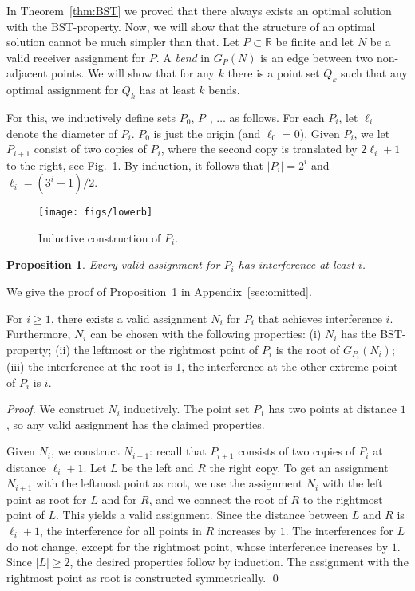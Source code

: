 \documentclass[envcountsect,envcountsame,runningheads,a4paper]{llncs}
\newtheorem{prop}[theorem]{Proposition}
\newcommand\R{{\mathbb R}}
\begin{document}
In Theorem~\ref{thm:BST} we proved that there always exists an
optimal solution with the BST-property. Now, we will
show that the structure of an optimal solution cannot
be much simpler than that. Let $P \subset \R$ be finite
and let $N$ be a valid receiver assignment for $P$. A \emph{bend} in $G_P(N)$
is an edge between two non-adjacent points. We will show that
for any $k$ there is a point set $Q_k$ such that any optimal
assignment for $Q_k$ has at least $k$ bends.

For this, we inductively define sets $P_0$, $P_1$, $\ldots$ as follows.
For each $P_i$, let $\ell_i$ denote the diameter of $P_i$.
$P_0$ is just the origin (and $\ell_0 = 0$). Given $P_i$, we let $P_{i+1}$
consist of two copies of $P_i$, where the second copy is translated
by $2\ell_i + 1$ to the right, see Fig.~\ref{fig:lowerb}. By induction,
it follows that
$|P_i| = 2^i$ and $\ell_i = (3^i-1)/2$.

\begin{figure}
\centering
\texttt{[image: figs/lowerb]}
\caption{Inductive construction of $P_i$.}
\label{fig:lowerb}
\end{figure}

\begin{prop}\label{prop:lowerb}
Every valid assignment for $P_i$ has interference at least
$i$.
\end{prop}

We give the proof of Proposition~\ref{prop:lowerb} in Appendix~\ref{sec:omitted}.

\begin{lemma}\label{lem:opt_ass}
For $i \geq 1$, there exists a valid assignment $N_i$ for
$P_i$ that achieves interference $i$. Furthermore, $N_i$ can
be chosen with the following properties: (i) $N_i$ has the \textup{BST}-property;
(ii) the leftmost or the rightmost point of $P_i$ is the root
of $G_{P_i}(N_i)$; (iii) the interference at the root is
$1$, the interference at the other extreme point of $P_i$ is
$i$.
\end{lemma}

\begin{proof}
We construct $N_i$ inductively. The point set $P_1$
has two points at distance $1$, so any valid
assignment has the claimed properties.

Given $N_i$, we construct $N_{i+1}$: recall that $P_{i+1}$
consists of two copies of $P_i$ at distance
$\ell_i + 1$. Let $L$ be the left and $R$ the right copy.
To get an assignment $N_{i+1}$ with the leftmost point
as root, we use the assignment $N_i$ with the left point as root
for $L$ and for $R$,
and we connect the root of $R$ to the rightmost
point of $L$. This yields a valid assignment.
Since the distance between $L$ and $R$
is $\ell_i + 1$, the interference for all points in
$R$ increases by $1$.  The interferences for
$L$ do not change, except for the rightmost point,
whose interference increases by $1$. Since $|L| \geq 2$,
the desired properties follow by induction.
The assignment with the rightmost point as root is constructed
symmetrically.
\qed{}
\end{proof}
\end{document}
